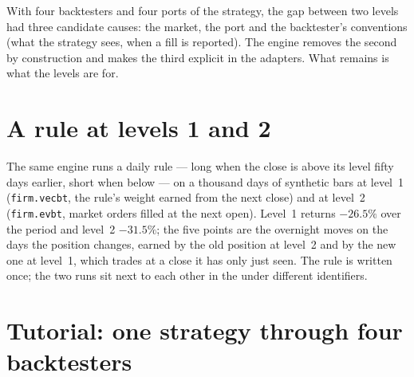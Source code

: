 \begin{remark}\label{rem:pl:backtest-engine-architecture:settled}
With four backtesters and four ports of the strategy, the gap between two levels had three candidate causes: the market, the port and the
backtester's conventions (what the strategy sees, when a fill is reported). The engine removes the second by construction and makes the
third explicit in the adapters. What remains is what the levels are for.
\end{remark}

\section{A rule at levels 1 and 2}

The same engine runs a daily rule --- long when the close is above its level fifty days earlier, short when below --- on a thousand days of
synthetic bars at level~1 (\texttt{firm.vecbt}, the rule's weight earned from the next close) and at level~2 (\texttt{firm.evbt}, market
orders filled at the next open). Level~1 returns $-26.5\%$ over the period and level~2 $-31.5\%$; the five points are the overnight moves
on the days the position changes, earned by the old position at level~2 and by the new one at level~1, which trades at a close it has
only just seen. The rule is written once; the two runs sit next to each other in the  under different identifiers.

\section{Tutorial: one strategy through four backtesters}\label{tut:pl:backtest-engine-architecture:tut}

